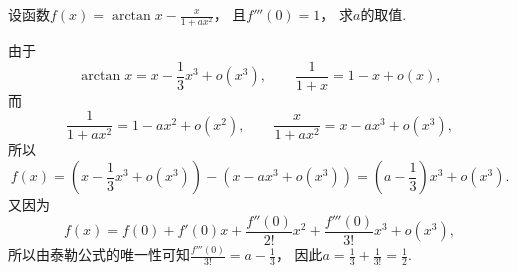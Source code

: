 \begin{example}
设函数\(f(x) = \arctan x - \frac{x}{1 + a x^2}\)，
且\(f'''(0) = 1\)，
求\(a\)的取值.
\begin{solution}
由于\begin{equation*}
	\arctan x = x - \frac13 x^3 + o(x^3),
	\qquad
	\frac1{1+x} = 1 - x + o(x),
\end{equation*}
而\begin{equation*}
	\frac1{1 + a x^2}
	= 1 - a x^2 + o(x^2),
	\qquad
	\frac{x}{1 + a x^2}
	= x - a x^3 + o(x^3),
\end{equation*}
所以\begin{equation*}
	f(x) = \left( x - \frac13 x^3 + o(x^3) \right)
	- \left( x - a x^3 + o(x^3) \right)
	= \left( a - \frac13 \right) x^3 + o(x^3).
\end{equation*}
又因为\begin{equation*}
	f(x) = f(0) + f'(0) x + \frac{f''(0)}{2!} x^2 + \frac{f'''(0)}{3!} x^3 + o(x^3),
\end{equation*}
所以由泰勒公式的唯一性可知\(\frac{f'''(0)}{3!} = a - \frac13\)，
因此\(a = \frac13 + \frac1{3!}
= \frac12\).
\end{solution}
\end{example}
